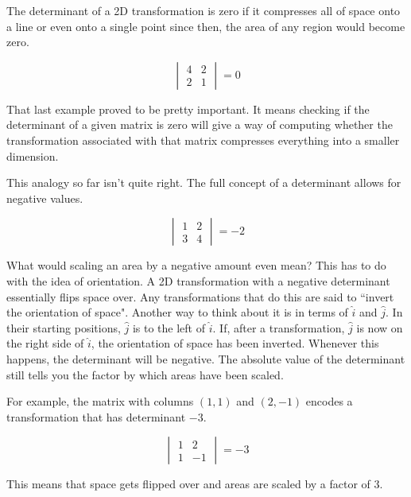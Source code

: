 The determinant of a 2D transformation is zero if it compresses all of space
onto a line or even onto a single point since then, the area of any region would
become zero.

\begin{equation*}
  \begin{vmatrix}
    4 & 2 \\
    2 & 1
  \end{vmatrix} = 0
\end{equation*}

That last example proved to be pretty important. It means checking if the
determinant of a given matrix is zero will give a way of computing whether the
transformation associated with that matrix compresses everything into a smaller
dimension.

This analogy so far isn't quite right. The full concept of a determinant allows
for negative values.

\begin{equation*}
  \begin{vmatrix}
    1 & 2 \\
    3 & 4
  \end{vmatrix} = -2
\end{equation*}

What would scaling an area by a negative amount even mean? This has to do with
the idea of orientation. A 2D transformation with a negative determinant
essentially flips space over. Any transformations that do this are said to
``invert the orientation of space". Another way to think about it is in terms of
$\hat{i}$ and $\hat{j}$. In their starting positions, $\hat{j}$ is to the left
of $\hat{i}$. If, after a transformation, $\hat{j}$ is now on the right side of
$\hat{i}$, the orientation of space has been inverted. Whenever this happens,
the determinant will be negative. The absolute value of the determinant still
tells you the factor by which areas have been scaled.

For example, the matrix with columns $(1, 1)$ and $(2, -1)$ encodes a
transformation that has determinant $-3$.

\begin{equation*}
  \begin{vmatrix}
    1 & 2 \\
    1 & -1
  \end{vmatrix} = -3
\end{equation*}

This means that space gets flipped over and areas are scaled by a factor of $3$.

